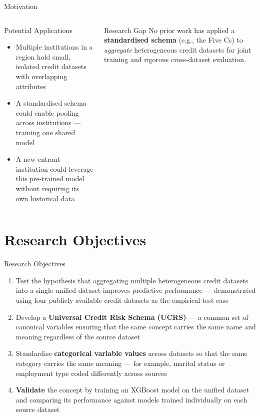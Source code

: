 \documentclass[9pt,aspectratio=169]{beamer}
\begin{document}
\begin{frame}{Motivation}
\begin{columns}[T]
    \begin{block}{Potential Applications}
      \footnotesize
      \begin{itemize}\setlength\itemsep{2pt}
        \item Multiple institutions in a region hold small, isolated credit
              datasets with overlapping attributes
        \item A standardised schema could enable pooling across institutions
              — training one shared model
        \item A new entrant institution could leverage this pre-trained model
              without requiring its own historical data
      \end{itemize}
    \end{block}
    \vspace{4pt}
    \begin{alertblock}{Research Gap}
      \footnotesize
      No prior work has applied a \textbf{standardised schema} (e.g., the Five Cs) to
      \emph{aggregate} heterogeneous credit datasets for joint training and
      rigorous cross-dataset evaluation.
    \end{alertblock}
\end{columns}
\end{frame}

\section{Research Objectives}

\begin{frame}{Research Objectives}
\vspace{8pt}
\begin{enumerate}\setlength\itemsep{10pt}
  \item Test the hypothesis that aggregating multiple heterogeneous credit
        datasets into a single unified dataset improves predictive performance
        --- demonstrated using four publicly available credit datasets as the
        empirical test case

  \item Develop a \textbf{Universal Credit Risk Schema (UCRS)} --- a common
        set of canonical variables ensuring that the same concept carries the
        same name and meaning regardless of the source dataset

  \item Standardise \textbf{categorical variable values} across datasets so
        that the same category carries the same meaning --- for example,
        marital status or employment type coded differently across sources

  \item \textbf{Validate} the concept by training an XGBoost model on the
        unified dataset and comparing its performance against models trained
        individually on each source dataset
\end{enumerate}
\end{frame}
\end{document}
